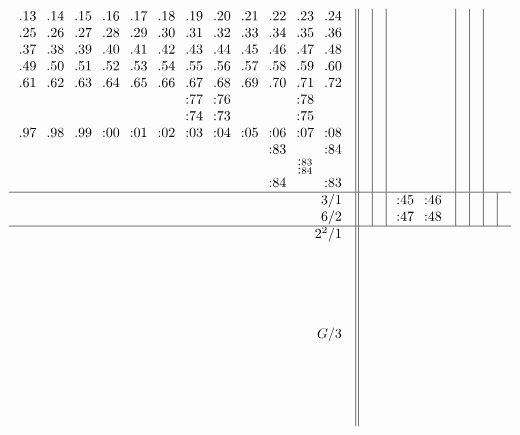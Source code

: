 \documentclass[12pt,a4paper]{amsart}
\begin{document}
\begin{align*}
\begin{array}{r||c|c|c|c|c|c|c}
\begin{array}{cccccccccccc}
\llap{.}13&\llap{.}14&\llap{.}15&\llap{.}16&\llap{.}17&\llap{.}18&\llap{.}19&\llap{.}20&\llap{.}21&\llap{.}22&\llap{.}23&\llap{.}24\\
\llap{.}25&\llap{.}26&\llap{.}27&\llap{.}28&\llap{.}29&\llap{.}30&\llap{.}31&\llap{.}32&\llap{.}33&\llap{.}34&\llap{.}35&\llap{.}36\\
\llap{.}37&\llap{.}38&\llap{.}39&\llap{.}40&\llap{.}41&\llap{.}42&\llap{.}43&\llap{.}44&\llap{.}45&\llap{.}46&\llap{.}47&\llap{.}48\\
\llap{.}49&\llap{.}50&\llap{.}51&\llap{.}52&\llap{.}53&\llap{.}54&\llap{.}55&\llap{.}56&\llap{.}57&\llap{.}58&\llap{.}59&\llap{.}60\\
\llap{.}61&\llap{.}62&\llap{.}63&\llap{.}64&\llap{.}65&\llap{.}66&\llap{.}67&\llap{.}68&\llap{.}69&\llap{.}70&\llap{.}71&\llap{.}72\\
&&&&&&\llap:77&\llap:76&&&\llap:78&\\
&&&&&&\llap:74&\llap:73&&&\llap:75&\\
\llap{.}97&\llap{.}98&\llap{.}99&\llap:00&\llap:01&\llap:02&\llap:03&\llap:04&\llap:05&\llap:06&\llap:07&\llap:08\\
&&&&&&&&&\llap:83&&\llap:84\\
&&&&&&&&&&^{\llap:83}_{\llap:84}&\\
&&&&&&&&&\llap:84&&\llap:83\\
  \end{array}
&&&&&\\\hline
    \begin{array}{r}
      3/1 \\ 6/2
    \end{array}
&&&
    \begin{array}{cc}
      \llap:45&\llap:46\\
      \llap:47&\llap:48
    \end{array}
&&&&\\\hline
    \begin{array}{r}
      2^2/1 \\ \\ \\ \\ \\ \\ G/3 \\ \\ \\ \\ \\ \\
    \end{array}

\end{array}
\end{align*}
\end{document}
